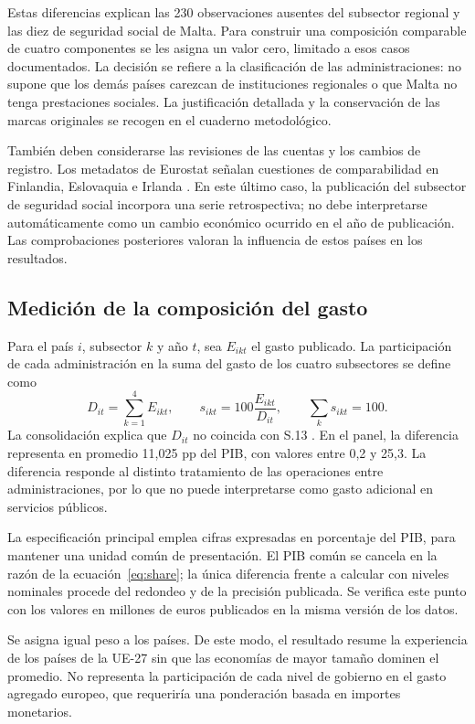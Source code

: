 \documentclass[11pt,a4paper]{article}
\begin{document}
Estas diferencias explican las 230 observaciones ausentes del subsector regional y las diez de seguridad social de Malta. Para construir una composición comparable de cuatro componentes se les asigna un valor cero, limitado a esos casos documentados. La decisión se refiere a la clasificación de las administraciones: no supone que los demás países carezcan de instituciones regionales o que Malta no tenga prestaciones sociales. La justificación detallada y la conservación de las marcas originales se recogen en el cuaderno metodológico.

También deben considerarse las revisiones de las cuentas y los cambios de registro. Los metadatos de Eurostat señalan cuestiones de comparabilidad en Finlandia, Eslovaquia e Irlanda \cite{meta}. En este último caso, la publicación del subsector de seguridad social incorpora una serie retrospectiva; no debe interpretarse automáticamente como un cambio económico ocurrido en el año de publicación. Las comprobaciones posteriores valoran la influencia de estos países en los resultados.

\subsection{Medición de la composición del gasto}
Para el país $i$, subsector $k$ y año $t$, sea $E_{ikt}$ el gasto publicado. La participación de cada administración en la suma del gasto de los cuatro subsectores se define como
\begin{equation}
 D_{it}=\sum_{k=1}^{4} E_{ikt},\qquad
 s_{ikt}=100\frac{E_{ikt}}{D_{it}},\qquad \sum_k s_{ikt}=100.
\label{eq:share}
\end{equation}
La consolidación explica que $D_{it}$ no coincida con S.13 \cite{meta}. En el panel, la diferencia representa en promedio 11,025 pp del PIB, con valores entre 0,2 y 25,3. La diferencia responde al distinto tratamiento de las operaciones entre administraciones, por lo que no puede interpretarse como gasto adicional en servicios públicos.

La especificación principal emplea cifras expresadas en porcentaje del PIB, para mantener una unidad común de presentación. El PIB común se cancela en la razón de la ecuación~\eqref{eq:share}; la única diferencia frente a calcular con niveles nominales procede del redondeo y de la precisión publicada. Se verifica este punto con los valores en millones de euros publicados en la misma versión de los datos.

Se asigna igual peso a los países. De este modo, el resultado resume la experiencia de los países de la UE-27 sin que las economías de mayor tamaño dominen el promedio. No representa la participación de cada nivel de gobierno en el gasto agregado europeo, que requeriría una ponderación basada en importes monetarios.
\end{document}
